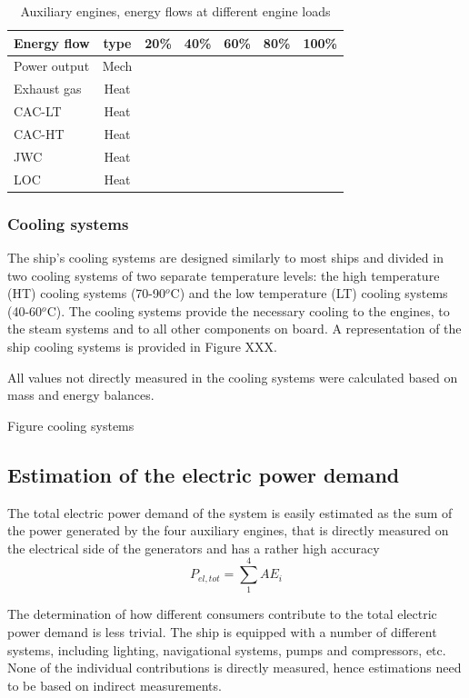 \documentclass[preprint,12pt]{elsarticle}
\begin{document}
\begin{table}
	\small
	\centering
	\begin{tabular}{lcrrrrr}
		\hline
		Energy flow & type & 20\% & 40\% & 60\% & 80\% & 100\% \\
		\hline
		Power output & Mech &  &  &  &  &  \\
		Exhaust gas & Heat &  &  &  &  &  \\
		CAC-LT & Heat &  &  &  &  &  \\
		CAC-HT & Heat &  &  &  &  &  \\
		JWC & Heat &  &  &  &  &  \\
		LOC & Heat &  &  &  &  &  \\
		\hline
	\end{tabular}
	\caption{Auxiliary engines, energy flows at different engine loads}
\end{table}


\subsubsection{Cooling systems}

The ship's cooling systems are designed similarly to most ships and divided in two cooling systems of two separate temperature levels: the high temperature (HT) cooling systems (70-90$^o$C) and the low temperature (LT) cooling systems (40-60$^o$C). The cooling systems provide the necessary cooling to the engines, to the steam systems and to all other components on board. A representation of the ship cooling systems is provided in Figure XXX. 

All values not directly measured in the cooling systems were calculated based on mass and energy balances. 

Figure cooling systems


\subsection{Estimation of the electric power demand} \label{sec:met:electric}

The total electric power demand of the system is easily estimated as the sum of the power generated by the four auxiliary engines, that is directly measured on the electrical side of the generators and has a rather high accuracy
\begin{equation}
P_{el,tot} = \sum_{1}^{4} AE_i
\end{equation}

The determination of how different consumers contribute to the total electric power demand is less trivial. The ship is equipped with a number of different systems, including lighting, navigational systems, pumps and compressors, etc. None of the individual contributions is directly measured, hence estimations need to be based on indirect measurements. 
\end{document}
